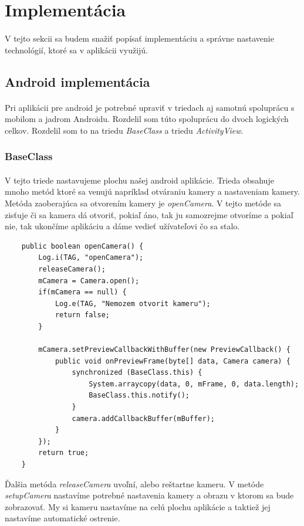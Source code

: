 \documentclass[12pt]{article}
\begin{document}
\section{Implementácia}
\paragraph{}
V tejto sekcii sa budem snažiť popísať implementáciu a správne nastavenie technológií, ktoré sa v aplikácii využijú.
\subsection{Android implementácia}
\paragraph{}
Pri aplikácii pre android je potrebné upraviť v triedach aj samotnú spoluprácu s mobilom a jadrom Androidu. Rozdelil som túto spoluprácu do dvoch logických celkov. Rozdelil som to na triedu \emph{BaseClass} a triedu \emph{ActivityView}.
\subsubsection{BaseClass}
\paragraph{}
V tejto triede nastavujeme plochu našej android aplikácie.
Trieda obsahuje mnoho metód ktoré sa venujú napríklad otváraniu kamery a nastaveniam kamery. Metóda zaoberajúca sa otvorením kamery je \emph{openCamera}.
V tejto metóde sa zisťuje či sa kamera dá otvoriť, pokiaľ áno, tak ju samozrejme otvoríme a pokiaľ nie, tak ukončíme aplikáciu a dáme vedieť užívateľovi čo sa stalo.
\begin{lstlisting}
	public boolean openCamera() {
        Log.i(TAG, "openCamera");
        releaseCamera();
        mCamera = Camera.open();
        if(mCamera == null) {
        	Log.e(TAG, "Nemozem otvorit kameru");
        	return false;
        }

        mCamera.setPreviewCallbackWithBuffer(new PreviewCallback() {
            public void onPreviewFrame(byte[] data, Camera camera) {
                synchronized (BaseClass.this) {
                    System.arraycopy(data, 0, mFrame, 0, data.length);
                    BaseClass.this.notify(); 
                }
                camera.addCallbackBuffer(mBuffer);
            }
        });
        return true;
    }
\end{lstlisting}
Ďalšia metóda \emph{releaseCamera} uvoľní, alebo reštartne kameru. V metóde \emph{setupCamera} nastavíme potrebné nastavenia kamery a obrazu v ktorom sa bude zobrazovať.
My si kameru nastavíme na celú plochu aplikácie a taktiež jej nastavíme automatické ostrenie.
\end{document}
